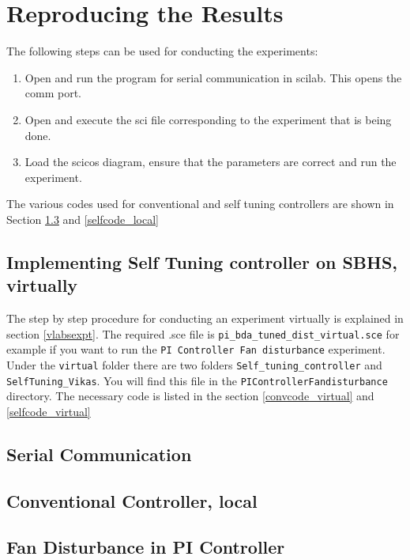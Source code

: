 \section{Reproducing the Results}
The following steps can be used for conducting the experiments:
\begin{enumerate}
	\item Open and run the program for serial communication in scilab. This opens the comm port.
	\item Open and execute the sci file corresponding to the experiment that is being done.
	\item Load the scicos diagram, ensure that the parameters are correct and run the experiment.
\end{enumerate}
The various codes used for conventional and self tuning controllers are shown in Section \ref{convcode_local} and \ref{selfcode_local}


\subsection{Implementing Self Tuning controller on SBHS, virtually}
The step by step procedure for conducting an experiment virtually is explained in section \ref{vlabsexpt}. The required .sce file is {\tt pi\_bda\_tuned\_dist\_virtual.sce} for example if you want to run the {\tt PI Controller Fan disturbance} experiment.  Under the {\tt virtual} folder there are two folders {\tt Self\_tuning\_controller} and {\tt SelfTuning\_Vikas}. You will find this file in the {\tt PIControllerFandisturbance} directory. The necessary code is listed in the section \ref{convcode_virtual} and \ref{selfcode_virtual}


\subsection{Serial Communication}
\begin{code}

\end{code}


\subsection{Conventional Controller, local}\label{convcode_local}
\subsection{Fan Disturbance in PI Controller}
\begin{code}

\end{code}



